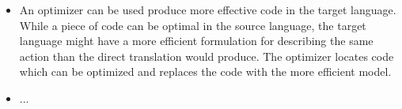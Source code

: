 \begin{itemize}
\item An optimizer can be used produce more effective code in the target language. While a piece of code can be optimal in the source language, the target language might have a more efficient formulation for describing the same action than the direct translation would produce. The optimizer locates code which can be optimized and replaces the code with the more efficient model.

\item...
\end{itemize}
